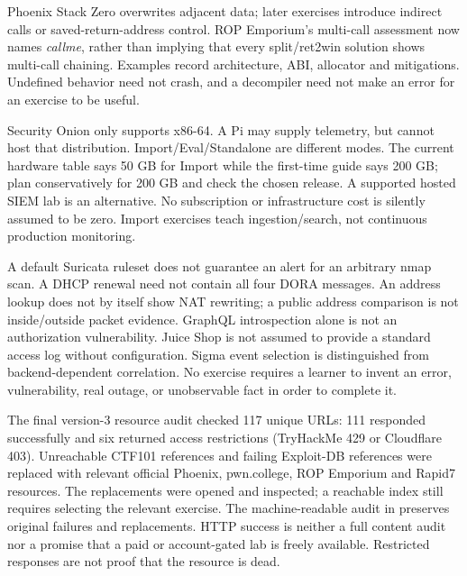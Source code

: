 Phoenix Stack Zero overwrites adjacent data; later exercises introduce indirect
calls or saved-return-address control. ROP Emporium's multi-call assessment now
names \emph{callme}, rather than implying that every split/ret2win solution shows
multi-call chaining. Examples record architecture, ABI, allocator and mitigations.
Undefined behavior need not crash, and a decompiler need not make an error for an
exercise to be useful.

Security Onion only supports x86-64. A Pi may supply telemetry, but cannot host
that distribution. Import/Eval/Standalone are different modes. The current
hardware table says 50 GB for Import while the first-time guide says 200 GB;
plan conservatively for 200 GB and check the chosen release. A supported hosted
SIEM lab is an alternative. No subscription or infrastructure cost is silently
assumed to be zero. Import exercises teach ingestion/search, not continuous
production monitoring.

A default Suricata ruleset does not guarantee an alert for an arbitrary nmap scan.
A DHCP renewal need not contain all four DORA messages. An address lookup does not
by itself show NAT rewriting; a public address comparison is not inside/outside
packet evidence. GraphQL introspection alone is not an authorization vulnerability.
Juice Shop is not assumed to provide a standard access log without configuration.
Sigma event selection is distinguished from backend-dependent correlation.
No exercise requires a learner to invent an error, vulnerability, real outage,
or unobservable fact in order to complete it.

The final version-3 resource audit checked 117 unique URLs: 111 responded
successfully and six returned access restrictions (TryHackMe 429 or Cloudflare
403). Unreachable CTF101 references and failing Exploit-DB references were replaced
with relevant official Phoenix, pwn.college, ROP Emporium and Rapid7 resources.
The replacements were opened and inspected; a reachable index still requires
selecting the relevant exercise. The machine-readable audit in
 preserves original failures and
replacements. HTTP success is neither a full content audit nor a promise that a
paid or account-gated lab is freely available. Restricted responses are not proof
that the resource is dead.

